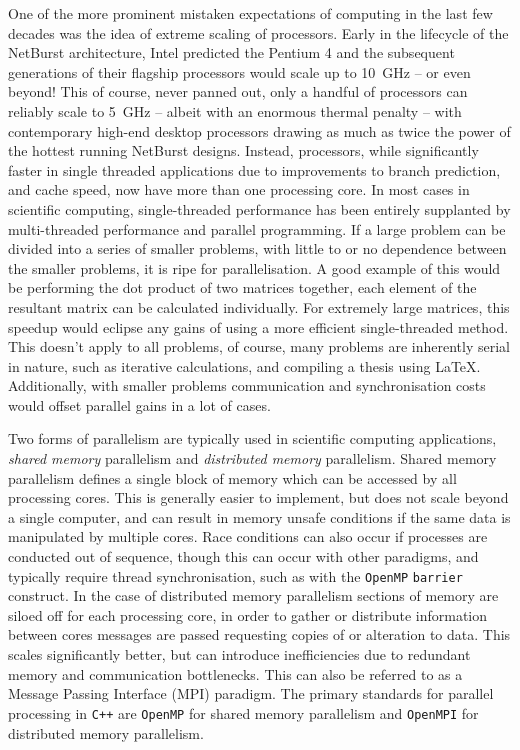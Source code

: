 One of the more prominent mistaken expectations of computing in the last few decades was the idea of extreme scaling of processors.
Early in the lifecycle of the NetBurst architecture, Intel predicted the Pentium 4 and the subsequent generations of their flagship processors would scale up to \SI{10}{\giga\hertz} -- or even beyond!
This of course, never panned out, only a handful of processors can reliably scale to \SI{5}{\giga\hertz} -- albeit with an enormous thermal penalty -- with contemporary high-end desktop processors drawing as much as twice the power of the hottest running NetBurst designs.
Instead, processors, while significantly faster in single threaded applications due to improvements to branch prediction, and cache speed, now have more than one processing core.
In most cases in scientific computing, single-threaded performance has been entirely supplanted by multi-threaded performance and parallel programming.
If a large problem can be divided into a series of smaller problems, with little to or no dependence between the smaller problems, it is ripe for parallelisation.
A good example of this would be performing the dot product of two matrices together, each element of the resultant matrix can be calculated individually.
For extremely large matrices, this speedup would eclipse any gains of using a more efficient single-threaded method.
This doesn't apply to all problems, of course, many problems are inherently serial in nature, such as iterative calculations, and compiling a thesis using \LaTeX.
Additionally, with smaller problems communication and synchronisation costs would offset parallel gains in a lot of cases.

Two forms of parallelism are typically used in scientific computing applications, \emph{shared memory} parallelism and \emph{distributed memory} parallelism.
Shared memory parallelism defines a single block of memory which can be accessed by all processing cores.
This is generally easier to implement, but does not scale beyond a single computer, and can result in memory unsafe conditions if the same data is manipulated by multiple cores.
Race conditions can also occur if processes are conducted out of sequence, though this can occur with other paradigms, and typically require thread synchronisation, such as with the \texttt{OpenMP} \texttt{barrier} construct.
In the case of distributed memory parallelism sections of memory are siloed off for each processing core, in order to gather or distribute information between cores messages are passed requesting copies of or alteration to data.
This scales significantly better, but can introduce inefficiencies due to redundant memory and communication bottlenecks.
This can also be referred to as a Message Passing Interface (MPI) paradigm.
The primary standards for parallel processing in \texttt{C++} are \texttt{OpenMP} for shared memory parallelism and \texttt{OpenMPI} for distributed memory parallelism.

